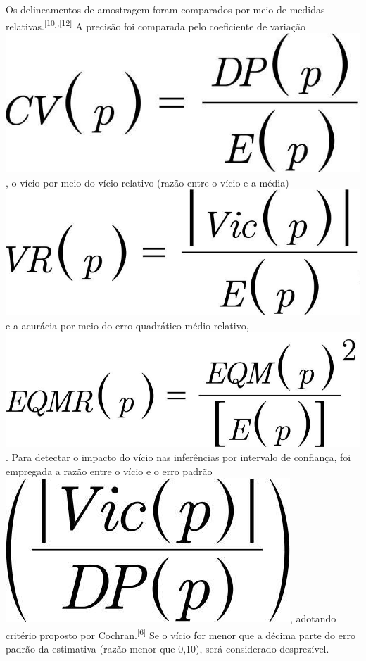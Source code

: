 \documentclass{article}
\begin{document}
Os delineamentos de amostragem foram comparados por meio de medidas
relativas.\textsuperscript{[}\textsuperscript{10}\textsuperscript{]}\textsuperscript{,}\textsuperscript{[}\textsuperscript{12}\textsuperscript{]}
A precisão foi comparada pelo coeficiente de variação
\includegraphics{0034-8910-rsp-48-01-0086-ii03}, o vício por meio do vício
relativo (razão entre o vício e a
média)\includegraphics{0034-8910-rsp-48-01-0086-ii04} e a acurácia por meio do
erro quadrático médio relativo, \includegraphics{0034-8910-rsp-48-01-0086-ii05}.
Para detectar o impacto do vício nas inferências por intervalo de confiança, foi
empregada a razão entre o vício e o erro padrão
\includegraphics{0034-8910-rsp-48-01-0086-ii06}, adotando critério proposto por
Cochran.\textsuperscript{[}\textsuperscript{6}\textsuperscript{]}
Se o vício for menor que a décima parte do erro padrão da estimativa (razão
menor que 0,10), será considerado desprezível.
\end{document}
